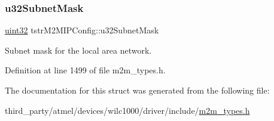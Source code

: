 \subsubsection{\texorpdfstring{u32\+Subnet\+Mask}{u32SubnetMask}}
{\footnotesize\ttfamily \hyperlink{group__DataT_ga100e7c691a47d6978527c479a0158245}{uint32} tstr\+M2\+M\+I\+P\+Config\+::u32\+Subnet\+Mask}

Subnet mask for the local area network. 

Definition at line 1499 of file m2m\+\_\+types.\+h.



The documentation for this struct was generated from the following file\+:\begin{DoxyCompactItemize}
\item 
third\+\_\+party/atmel/devices/wilc1000/driver/include/\hyperlink{m2m__types_8h}{m2m\+\_\+types.\+h}\end{DoxyCompactItemize}
